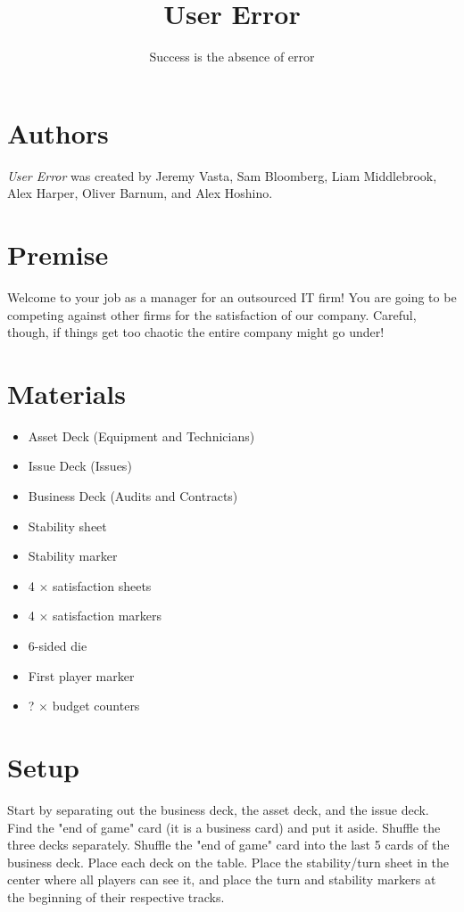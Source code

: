 \documentclass[twocolumn]{article}
\title{User Error}
\author{Success is the absence of error}
\date{}
\begin{document}
\maketitle

\section*{Authors}

\emph{User Error} was created by Jeremy Vasta, Sam Bloomberg, Liam Middlebrook, Alex Harper, Oliver Barnum, and Alex Hoshino.

\section*{Premise}

Welcome to your job as a manager for an outsourced IT firm! You are going to be competing against other firms for the satisfaction of our company. Careful, though, if things get too chaotic the entire company might go under!

\section*{Materials}

\begin{itemize}
	\item Asset Deck (Equipment and Technicians)
	\item Issue Deck (Issues)
	\item Business Deck (Audits and Contracts)
	\item Stability sheet
	\item Stability marker
	\item 4 $\times$ satisfaction sheets
	\item 4 $\times$ satisfaction markers
	\item 6-sided die
	\item First player marker
	\item ? $\times$ budget counters
\end{itemize}

\section*{Setup}

Start by separating out the business deck, the asset deck, and the issue deck. Find the "end of game" card (it is a business card) and put it aside. Shuffle the three decks separately. Shuffle the "end of game" card into the last 5 cards of the business deck. Place each deck on the table. Place the stability/turn sheet in the center where all players can see it, and place the turn and stability markers at the beginning of their respective tracks.
\end{document}
